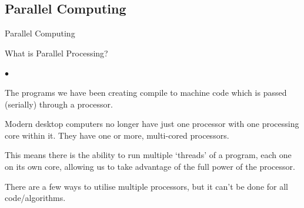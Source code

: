 \documentclass[smaller,handout,table]{beamer}
\begin{document}
\subsection{Parallel Computing}
\begin{frame}{Parallel Computing}
\begin{block}{What is Parallel Processing?}
\begin{list}{$\bullet$}{}
\item The programs we have been creating compile to machine code which is passed (serially) through a processor.
\item Modern desktop computers no longer have just one processor with one processing core within it. They have one or more, multi-cored processors.
\item This means there is the ability to run multiple `threads' of a program, each one on its own core, allowing us to take advantage of the full power of the processor.
\item There are a few ways to utilise multiple processors, but it can't be done for all code/algorithms.
\end{list}
\end{block}
\end{frame}
\end{document}
